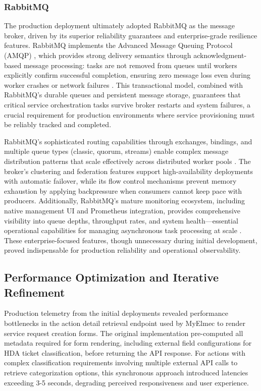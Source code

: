 \subsubsection{RabbitMQ}
The production deployment ultimately adopted RabbitMQ as the message broker, driven by its superior reliability guarantees and enterprise-grade resilience features. RabbitMQ implements the Advanced Message Queuing Protocol (AMQP) \cite{amqp}, which provides strong delivery semantics through acknowledgment-based message processing: tasks are not removed from queues until workers explicitly confirm successful completion, ensuring zero message loss even during worker crashes or network failures \cite{amqp}. This transactional model, combined with RabbitMQ's durable queues and persistent message storage, guarantees that critical service orchestration tasks survive broker restarts and system failures, a crucial requirement for production environments where service provisioning must be reliably tracked and completed.

RabbitMQ's sophisticated routing capabilities through exchanges, bindings, and multiple queue types (classic, quorum, streams) enable complex message distribution patterns that scale effectively across distributed worker pools \cite{videla2012rabbitmq}. The broker's clustering and federation features support high-availability deployments with automatic failover, while its flow control mechanisms prevent memory exhaustion by applying backpressure when consumers cannot keep pace with producers. Additionally, RabbitMQ's mature monitoring ecosystem, including native management UI and Prometheus integration, provides comprehensive visibility into queue depths, throughput rates, and system health—essential operational capabilities for managing asynchronous task processing at scale \cite{videla2012rabbitmq}. These enterprise-focused features, though unnecessary during initial development, proved indispensable for production reliability and operational observability.

\subsection{Performance Optimization and Iterative Refinement}

Production telemetry from the initial deployments revealed performance bottlenecks in the action detail retrieval endpoint used by MyElmec to render service request creation forms. The original implementation pre-computed all metadata required for form rendering, including external field configurations for HDA ticket classification, before returning the API response. For actions with complex classification requirements involving multiple external API calls to retrieve categorization options, this synchronous approach introduced latencies exceeding 3-5 seconds, degrading perceived responsiveness and user experience.

